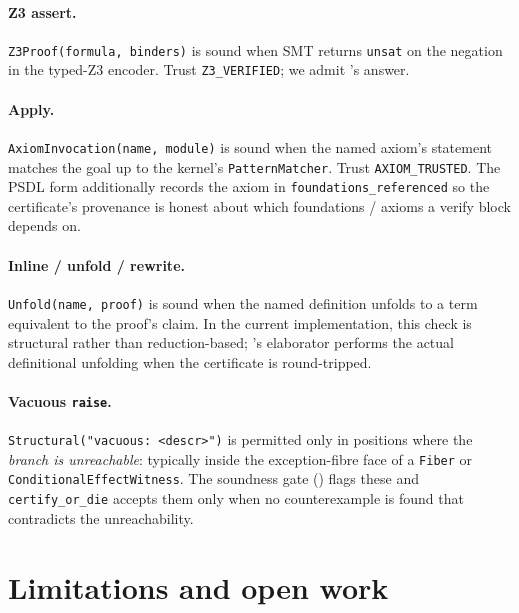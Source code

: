 \paragraph{Z3 assert.}
\texttt{Z3Proof(formula, binders)} is sound when SMT returns
\texttt{unsat} on the negation in the typed-Z3 encoder.  Trust
\texttt{Z3\_VERIFIED}; we admit \Zthree's answer.

\paragraph{Apply.}
\texttt{AxiomInvocation(name, module)} is sound when the named
axiom's statement matches the goal up to the kernel's
\texttt{PatternMatcher}.  Trust \texttt{AXIOM\_TRUSTED}.  The
PSDL form additionally records the axiom in
\texttt{foundations\_referenced} so the certificate's provenance is
honest about which foundations / axioms a verify block depends on.

\paragraph{Inline / unfold / rewrite.}
\texttt{Unfold(name, proof)} is sound when the named definition
unfolds to a term equivalent to the proof's claim.  In the current
implementation, this check is structural rather than reduction-based;
\Lean's elaborator performs the actual definitional unfolding when
the certificate is round-tripped.

\paragraph{Vacuous \texttt{raise}.}
\texttt{Structural("vacuous: <descr>")} is permitted only in
positions where the \emph{branch is unreachable}: typically inside
the exception-fibre face of a \texttt{Fiber} or
\texttt{ConditionalEffectWitness}.  The soundness gate
() flags these and \texttt{certify\_or\_die}
accepts them only when no counterexample is found that contradicts
the unreachability.

\section{Limitations and open work}
\label{sec:psdl-limitations}

